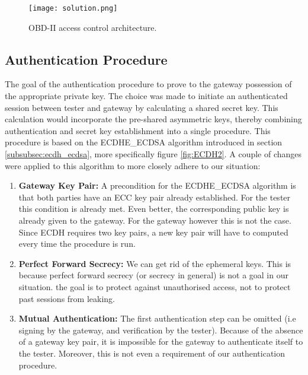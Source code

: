 \begin{figure}[h]
	\label{fig:solution}
	\centering
	\texttt{[image: solution.png]}
	\caption{OBD-II access control architecture.}
\end{figure}


\subsection{Authentication Procedure}
\label{subsec:authentication_procedure}

The goal of the authentication procedure to prove to the gateway possession of the appropriate private key. The choice was made to initiate an authenticated session between tester and gateway by calculating a shared secret key. This calculation would incorporate the pre-shared asymmetric keys, thereby combining authentication and secret key establishment into a single procedure. This procedure is based on the ECDHE\_ECDSA algorithm introduced in section \ref{subsubsec:ecdh_ecdsa}, more specifically figure \ref{fig:ECDH2}. A couple of changes were applied to this algorithm to more closely adhere to our situation:
\begin{enumerate}
	\item \textbf{Gateway Key Pair:} A precondition for the ECDHE\_ECDSA algorithm is that both parties have an ECC key pair already established. For the tester this condition is already met. Even better, the corresponding public key is already given to the gateway. For the gateway however this is not the case. Since ECDH requires two key pairs, a new key pair will have to computed every time the procedure is run.
	
	\item \textbf{Perfect Forward Secrecy:} We can get rid of the ephemeral keys. This is because perfect forward secrecy (or secrecy in general) is not a goal in our situation. the goal is to protect against unauthorised access, not to protect past sessions from leaking. 
	
	\item \textbf{Mutual Authentication:} The first authentication step can be omitted (i.e signing by the gateway, and verification by the tester). Because of the absence of a gateway key pair, it is impossible for the gateway to authenticate itself to the tester. Moreover, this is not even a requirement of our authentication procedure.
\end{enumerate}
